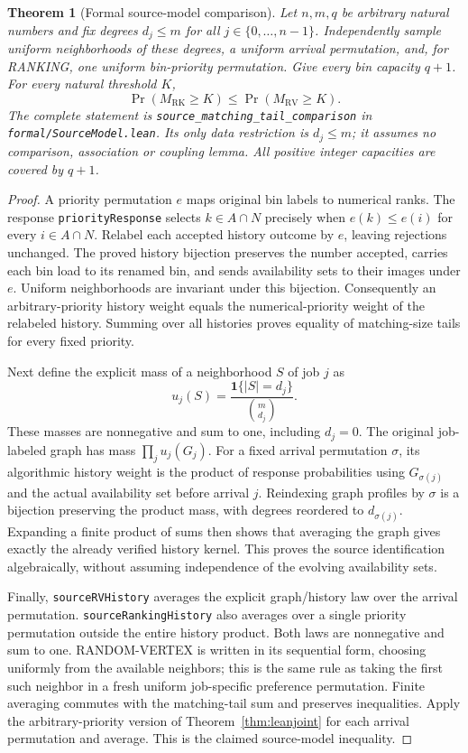 \documentclass[11pt]{article}
\newtheorem{theorem}{Theorem}
\newcommand{\RV}{\mathrm{RV}}
\newcommand{\RK}{\mathrm{RK}}
\begin{document}
\begin{theorem}[Formal source-model comparison]\label{thm:leansource}
Let $n,m,q$ be arbitrary natural numbers and fix degrees
$d_j\leq m$ for all $j\in\{0,\ldots,n-1\}$. Independently sample
uniform neighborhoods of these degrees, a uniform arrival permutation,
and, for RANKING, one uniform bin-priority permutation. Give every bin
capacity $q+1$. For every natural threshold $K$,
\[
 \Pr(M_{\RK}\geq K)\leq\Pr(M_{\RV}\geq K).
\]
The complete statement is \texttt{source\_matching\_tail\_comparison}
in \texttt{formal/SourceModel.lean}. Its only data restriction is
$d_j\leq m$; it assumes no comparison, association or coupling lemma.
All positive integer capacities are covered by $q+1$.
\end{theorem}
\begin{proof}
A priority permutation $e$ maps original bin labels to numerical ranks.
The response \texttt{priorityResponse} selects $k\in A\cap N$ precisely
when $e(k)\leq e(i)$ for every $i\in A\cap N$. Relabel each accepted
history outcome by $e$, leaving rejections unchanged. The proved history
bijection preserves the number accepted, carries each bin load to its
renamed bin, and sends availability sets to their images under $e$.
Uniform neighborhoods are invariant under this bijection. Consequently
an arbitrary-priority history weight equals the numerical-priority weight
of the relabeled history. Summing over all histories proves equality of
matching-size tails for every fixed priority.

Next define the explicit mass of a neighborhood $S$ of job $j$ as
\[
 u_j(S)=\frac{\mathbf 1\{|S|=d_j\}}{\binom m{d_j}}.
\]
These masses are nonnegative and sum to one, including $d_j=0$.
The original job-labeled graph has mass $\prod_j u_j(G_j)$.
For a fixed arrival permutation $\sigma$, its algorithmic history weight
is the product of response probabilities using $G_{\sigma(j)}$ and the
actual availability set before arrival $j$. Reindexing graph profiles
by $\sigma$ is a bijection preserving the product mass, with degrees
reordered to $d_{\sigma(j)}$. Expanding a finite product of sums then
shows that averaging the graph gives exactly the already verified
history kernel. This proves the source identification algebraically,
without assuming independence of the evolving availability sets.

Finally, \texttt{sourceRVHistory} averages the explicit graph/history law
over the arrival permutation. \texttt{sourceRankingHistory} also averages
over a single priority permutation outside the entire history product.
Both laws are nonnegative and sum to one. RANDOM-VERTEX is written in
its sequential form, choosing uniformly from the available neighbors;
this is the same rule as taking the first such neighbor in a fresh
uniform job-specific preference permutation. Finite averaging commutes
with the matching-tail sum and preserves inequalities. Apply the
arbitrary-priority version of Theorem~\ref{thm:leanjoint} for each arrival
permutation and average. This is the claimed source-model inequality.
\end{proof}
\end{document}
